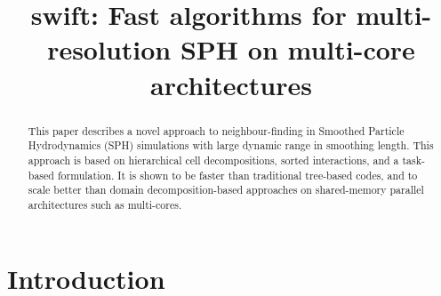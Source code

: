 \documentclass[a4paper,conference]{IEEEtran}
\begin{document}
\title{{\sc swift}: Fast algorithms for multi-resolution SPH on
multi-core architectures}


\author{
}



\maketitle

\begin{abstract}
This paper describes a novel approach to neighbour-finding in
Smoothed Particle Hydrodynamics (SPH) simulations with large dynamic
range in smoothing length.
This approach is based on hierarchical cell decompositions, sorted interactions,
and a task-based formulation.
It is shown to be faster than traditional tree-based
codes, and to scale better than domain decomposition-based approaches on
shared-memory parallel architectures such as multi-cores.
\end{abstract}




\section{Introduction}
\end{document}
